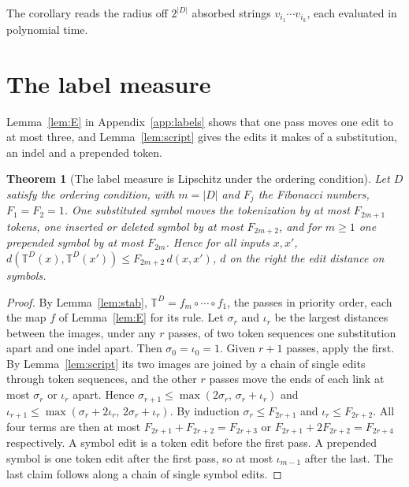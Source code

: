 \documentclass[11pt,a4paper]{article}
\theoremstyle{definition}
\theoremstyle{plain}
\newtheorem{theorem}{Theorem}
\newcommand{\T}{\mathbb{T}}
\begin{document}
The corollary reads the radius off \(2^{|D|}\) absorbed strings \(v_{i_1} \cdots v_{i_k}\), each evaluated in polynomial
time.

\section{The label measure}\label{sec:labels}

Lemma~\ref{lem:E} in Appendix~\ref{app:labels} shows that one pass moves one edit to at most three, and
Lemma~\ref{lem:script} gives the edits it makes of a substitution, an indel and a prepended token.


\begin{theorem}[The label measure is Lipschitz under the ordering condition]\label{thm:label}
Let \(D\) satisfy the ordering condition, with \(m = |D|\) and \(F_j\) the Fibonacci numbers, \(F_1 = F_2 = 1\). One
substituted symbol moves the tokenization by at most \(F_{2m+1}\) tokens, one inserted or deleted symbol by at most
\(F_{2m+2}\), and for \(m \ge 1\) one prepended symbol by at most \(F_{2m}\). Hence for all inputs \(x, x'\),
\(d(\T^D(x), \T^D(x')) \le F_{2m+2}\, d(x, x')\), \(d\) on the right the edit distance on symbols.
\end{theorem}

\begin{proof}
By Lemma~\ref{lem:stab}, \(\T^D = f_m \circ \cdots \circ f_1\), the passes in priority order, each the map \(f\) of
Lemma~\ref{lem:E} for its rule. Let \(\sigma_r\) and \(\iota_r\) be the largest distances between the images, under any
\(r\) passes, of two token sequences one substitution apart and one indel apart. Then \(\sigma_0 = \iota_0 = 1\). Given
\(r + 1\) passes, apply the first. By Lemma~\ref{lem:script} its two images are joined by a chain of single edits
through token sequences, and the other \(r\) passes move the ends of each link at most \(\sigma_r\) or \(\iota_r\)
apart. Hence \(\sigma_{r+1} \le \max(2\sigma_r,\, \sigma_r + \iota_r)\) and
\(\iota_{r+1} \le \max(\sigma_r + 2\iota_r,\, 2\sigma_r + \iota_r)\). By induction \(\sigma_r \le F_{2r+1}\) and
\(\iota_r \le F_{2r+2}\). All four terms are then at most \(F_{2r+1} + F_{2r+2} = F_{2r+3}\) or
\(F_{2r+1} + 2F_{2r+2} = F_{2r+4}\) respectively. A symbol edit is a token edit before the first pass. A prepended
symbol is one token edit after the first pass, so at most \(\iota_{m-1}\) after the last. The last claim follows along a
chain of single symbol edits.
\end{proof}
\end{document}
